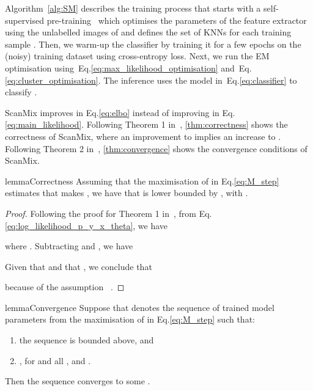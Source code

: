 \documentclass[review]{elsarticle}
\theoremstyle{plain}
\begin{document}
Algorithm~\ref{alg:SM} describes the training process
that starts with a self-supervised pre-training~\citep{SimCLR,MoCo,MoCoV2,SCAN} which optimises the parameters of the feature extractor  using the unlabelled images of  and defines the set of KNNs for each training sample .
Then, we warm-up the classifier by training it for a few epochs on the (noisy) training dataset using cross-entropy loss. 
Next, we run the EM optimisation using~Eq.\ref{eq:max_likelihood_optimisation}
and~Eq.\ref{eq:cluster_optimisation}.
The inference uses the model in~Eq.\ref{eq:classifier} to classify .

ScanMix improves  in Eq.\ref{eq:elbo} instead of improving  in Eq.\ref{eq:main_likelihood}.  Following Theorem 1 in~\citep{dempster1977maximum}, \autoref{thm:correctness} shows the correctness of ScanMix, where an improvement to  implies an increase to .
Following Theorem 2 in~\citep{dempster1977maximum}, \autoref{thm:convergence} shows the convergence conditions of ScanMix. 



\begin{restatable}[]{lemma}{Correctness}
    \label{thm:correctness}
    Assuming that the maximisation of  in Eq.\ref{eq:M_step} estimates  that makes 
    , we have that  is lower bounded by , with .
 \end{restatable}


\begin{proof}
Following the proof for Theorem 1 in~\citep{dempster1977maximum}, from Eq.\ref{eq:log_likelihood_p_y_x_theta}, we have

where . Subtracting 
 and , we have

Given that  and that , we conclude that


because of the assumption ~\citep{dempster1977maximum}.

\end{proof}


\begin{restatable}[]{lemma}{Convergence}
    \label{thm:convergence}
    Suppose that  denotes the sequence of trained model parameters from the maximisation of  in Eq.\ref{eq:M_step} such that:
    \begin{enumerate}
        \item the sequence  is bounded above, and
        \item \footnotesize , for  and all , and .  
    \end{enumerate}
    Then the sequence  converges to some .
 \end{restatable}
\end{document}
